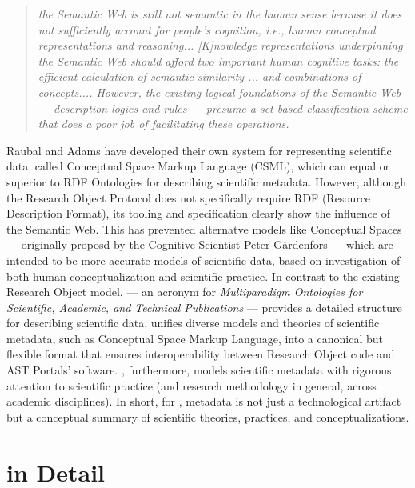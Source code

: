\documentclass[10pt,letterpaper]{article}
\begin{document}
\begin{quote}{\textit{
 the Semantic Web is still not semantic in the 
 human sense because it does not sufficiently 
account for people's cognition, i.e., human conceptual 
representations and reasoning...  [K]nowledge representations 
underpinning the Semantic Web should
afford two important human cognitive tasks: 
the efficient calculation of semantic similarity ... 
and combinations of concepts.... However, 
the existing logical foundations of the Semantic
Web --- description logics and rules --- presume a set-based 
classification scheme that does a poor job of
facilitating these operations.}} 
\end{quote}

Raubal and Adams have developed their own system 
for representing scientific data, called Conceptual 
Space Markup Language (CSML), which can 
equal or superior to RDF Ontologies for describing 
scientific metadata.  However, 
although the Research Object Protocol 
does not specifically require RDF (Resource Description 
Format), its tooling and specification clearly 
show the influence of the Semantic Web.  
This has prevented alternatve models like 
Conceptual Spaces --- originally proposd 
by the Cognitive Scientist Peter G\"ardenfors 
--- which are intended to be more 
accurate models of scientific data, based on investigation 
of both human conceptualization and scientific practice. 
\p{} 
In contrast to the existing Research Object model, 
{\MOSAIC} --- an acronym for \textit{Multiparadigm 
Ontologies for Scientific, Academic, and Technical Publications} 
--- provides a detailed structure for 
describing scientific data.  
{\MOSAIC} unifies diverse models and theories of 
scientific metadata, such as Conceptual 
Space Markup Language, into a canonical but flexible format 
that ensures interoperability between Research Object code 
and AST Portals' software.  {\MOSAIC}, furthermore, 
models scientific metadata with rigorous attention 
to scientific practice (and research methodology 
in general, across academic disciplines).  In 
short, for {\MOSAIC}, metadata is not just a technological 
artifact but a conceptual summary of scientific theories, 
practices, and conceptualizations.  
\p{}
\section{{\lMOSAIC} in Detail}
\end{document}
